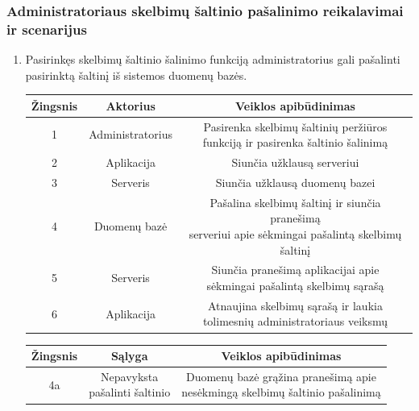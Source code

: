 \documentclass[12pt]{article}
\begin{document}
	\pagebreak
	
	\subsubsection{Administratoriaus skelbimų šaltinio pašalinimo reikalavimai ir scenarijus}
	\begin{enumerate}
		\item Pasirinkęs skelbimų šaltinio šalinimo funkciją administratorius gali pašalinti pasirinktą šaltinį iš sistemos duomenų bazės. 
		
		\begin{center}
		\begin{tabular}{ | c | c | c | }
			\hline
			Žingsnis & Aktorius         & Veiklos apibūdinimas \\ \hline
			1        & Administratorius & \makecell{Pasirenka skelbimų šaltinių peržiūros \\ funkciją ir pasirenka šaltinio šalinimą} \\ \hline
			2        & Aplikacija       & Siunčia užklausą serveriui \\ \hline
			3        & Serveris         & Siunčia užklausą duomenų bazei \\ \hline
			4        & Duomenų bazė     & \makecell{Pašalina skelbimų šaltinį ir siunčia pranešimą \\ serveriui apie sėkmingai pašalintą skelbimų šaltinį} \\ \hline
			5        & Serveris         & \makecell{Siunčia pranešimą aplikacijai apie \\ sėkmingai pašalintą skelbimų sąrašą} \\ \hline
			6        & Aplikacija       & \makecell{Atnaujina skelbimų sąrašą ir laukia \\ tolimesnių administratoriaus veiksmų} \\ \hline
		\end{tabular}
		\end{center}	
		
		\begin{center}
		\begin{tabular}{ | c | c | c | }
			\hline
			Žingsnis & Sąlyga         & Veiklos apibūdinimas \\ \hline
			4a       & \makecell{Nepavyksta \\ pašalinti šaltinio} & \makecell{Duomenų bazė grąžina pranešimą apie \\ nesėkmingą skelbimų šaltinio pašalinimą} \\ \hline
		\end{tabular}
		\end{center}	
		
		
	\end{enumerate}
	\pagebreak
	
\end{document}
